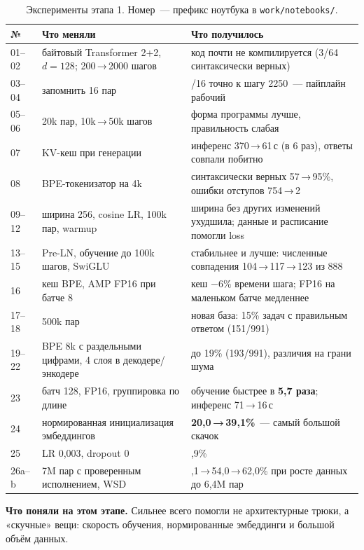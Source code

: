 \documentclass[11pt,a4paper]{article}
\begin{document}
\begin{table}[tbp]
\centering\small
\caption{Эксперименты этапа 1. Номер~--- префикс ноутбука в \texttt{work/notebooks/}.}
\label{tab:phase1}
\begin{tabularx}{\linewidth}{l>{\raggedright\arraybackslash}X>{\raggedright\arraybackslash}X}
\toprule
№ & Что меняли & Что получилось \\
\midrule
01--02 & байтовый Transformer 2+2, $d=128$; 200\,→\,2000 шагов & код почти не компилируется (3/64 синтаксически верных) \\
03--04 & запомнить 16 пар & 16/16 точно к шагу 2250~--- пайплайн рабочий \\
05--06 & 20k пар, 10k\,→\,50k шагов & форма программы лучше, правильность слабая \\
07 & KV-кеш при генерации & инференс 370\,→\,61\,с (в 6 раз), ответы совпали побитно \\
08 & BPE-токенизатор на 4k & синтаксически верных 57\,→\,95\%, ошибки отступов 754\,→\,2 \\
09--12 & ширина 256, cosine LR, 100k пар, warmup & ширина без других изменений ухудшила; данные и расписание помогли loss \\
13--15 & Pre-LN, обучение до 100k шагов, SwiGLU & стабильнее и лучше: численные совпадения 104\,→\,117\,→\,123 из 888 \\
16 & кеш BPE, AMP FP16 при батче 8 & кеш $-6\%$ времени шага; FP16 на маленьком батче медленнее \\
17--18 & 500k пар & новая база: 15\% задач с правильным ответом (151/991) \\
19--22 & BPE 8k с раздельными цифрами, 4 слоя в декодере/энкодере & до 19\% (193/991), различия на грани шума \\
23 & батч 128, FP16, группировка по длине & обучение быстрее в \textbf{5,7 раза}; инференс 71\,→\,16\,с \\
24 & нормированная инициализация эмбеддингов & \textbf{20,0\,→\,39,1\%}~--- самый большой скачок \\
25 & LR 0,003, dropout 0 & 40,9\% \\
26a--b & 7M пар с проверенным исполнением, WSD & 46,1\,→\,54,0\,→\,62,0\% при росте данных до 6,4M пар \\
\bottomrule
\end{tabularx}
\end{table}

\textbf{Что поняли на этом этапе.} Сильнее всего помогли не архитектурные трюки, а «скучные» вещи: скорость обучения, нормированные эмбеддинги и большой объём данных.
\end{document}
